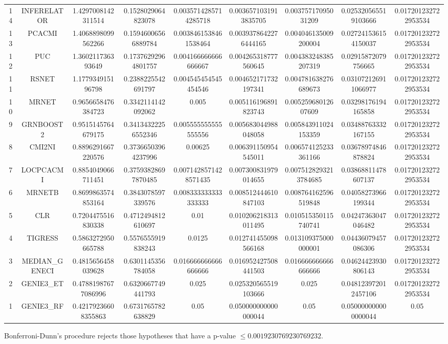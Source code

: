 \documentclass[a4paper,10pt]{article}
\begin{document}
\begin{landscape}
\begin{table}[!htp]
\begin{tabular}{ccccccccc}
14&INFERELATOR&1.4297008142311514&0.1528029064823078&0.0035714285714285718&0.0036571031913835705&0.00375717095031209&0.025320565519103666&0.017201232722953534\\
13&PCACMI&1.4068898099562266&0.15946006566889784&0.0038461538461538464&0.0039378642276444165&0.004046135009200004&0.027241536154150037&0.017201232722953534\\
12&PUC&1.360211736393649&0.17376292964801757&0.004166666666666667&0.004265318777560645&0.004383248385207319&0.02915872079756665&0.017201232722953534\\
11&RSNET&1.177934915196798&0.2388225542691797&0.004545454545454546&0.004652171732197341&0.004781638276689673&0.031072126911066977&0.017201232722953534\\
10&MRNET&0.9656658476384723&0.3342114142092062&0.005&0.005116196891823743&0.00525968012607609&0.03298176194165858&0.017201232722953534\\
9&GRNBOOST2&0.9515145764679175&0.34134322256552346&0.005555555555555556&0.005683044988048058&0.005843911024153359&0.03488763332167155&0.017201232722953534\\
8&CMI2NI&0.8896291667220576&0.37366503964237996&0.00625&0.006391150954545011&0.006574125233361166&0.03678974846878824&0.017201232722953534\\
7&LOCPCACMI&0.8854049066711451&0.37593828697870485&0.0071428571428571435&0.007300831979014655&0.0075128293213784685&0.03868811478607137&0.017201232722953534\\
6&MRNETB&0.8699863574853164&0.3843078597339576&0.008333333333333333&0.008512444610847103&0.008764162596519848&0.04058273966199344&0.017201232722953534\\
5&CLR&0.7204475516830338&0.4712494812610697&0.01&0.010206218313011495&0.010515350115740741&0.04247363047046482&0.017201232722953534\\
4&TIGRESS&0.5863272950665788&0.5576555919838243&0.0125&0.012741455098566168&0.013109375000000001&0.04436079457086306&0.017201232722953534\\
3&MEDIAN_GENECI&0.4815656458039628&0.6301145356784058&0.016666666666666666&0.016952427508441503&0.016666666666666666&0.04624423930806143&0.017201232722953534\\
2&GENIE3_ET&0.47881987677086996&0.6320667749441793&0.025&0.025320565519103666&0.025&0.048123972012457106&0.017201232722953534\\
1&GENIE3_RF&0.42179236608355863&0.6731765782638829&0.05&0.050000000000000044&0.05&0.050000000000000044&0.05\\
\hline
\end{tabular}
\end{table}
Bonferroni-Dunn's procedure rejects those hypotheses that have a p-value $\le0.0019230769230769232$.



\end{landscape}
\end{document}
